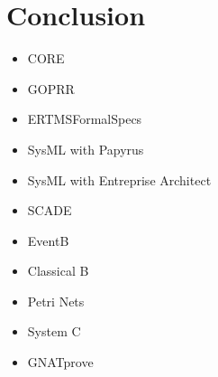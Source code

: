 

\chapter{Conclusion}

\tbd

\begin{itemize}
\item  CORE
\item  GOPRR
\item  ERTMSFormalSpecs
\item  SysML with Papyrus
\item  SysML with Entreprise Architect
\item  SCADE
\item  EventB 
\item  Classical B 
\item  Petri Nets
\item  System C
\item  GNATprove
\end{itemize}
